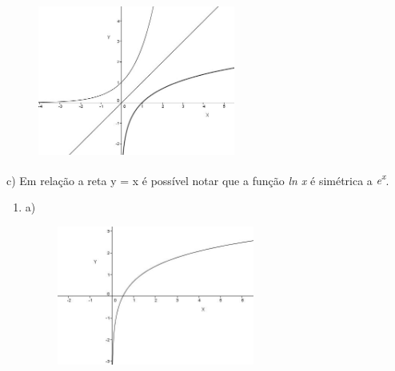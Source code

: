 \documentclass[12pt]{article}
\begin{document}
\begin{enumerate}

\begin{figure}[H]
	\begin{Center}
		\includegraphics[width=2.55in,height=1.94in]{./media/image25.JPG}
	\end{Center}
\end{figure}



c) Em relação a reta y = x é possível notar que a função \textit{ln x} é simétrica a \textit{e\textsuperscript{x}}. \par


\vspace{\baselineskip}

\end{enumerate}\begin{enumerate}
	\item a)\par




\begin{figure}[H]
	\begin{Center}
		\includegraphics[width=2.56in,height=1.81in]{./media/image26.JPG}
	\end{Center}
\end{figure}




\end{enumerate}
\end{document}
